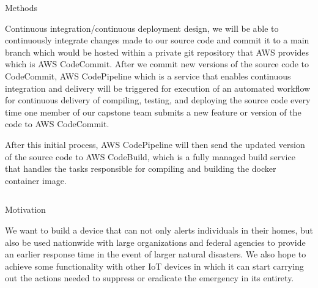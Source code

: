 \documentclass[final]{beamer}
\newlength{\onecolwid}
\newlength{\twocolwid}
\begin{document}
\begin{frame}[t]
\begin{columns}[t]
\begin{column}{\twocolwid}
\begin{columns}[t,totalwidth=\twocolwid]
\begin{column}{\onecolwid}

\begin{block}{Methods}

Continuous integration/continuous deployment design, we will be able to continuously integrate changes made to our source code  and commit it to a main branch which would be hosted within a private git repository that AWS provides which is AWS CodeCommit.  After we commit new versions of the source code to CodeCommit, AWS CodePipeline which is a service that enables continuous integration and delivery will be triggered for execution of an automated workflow for continuous delivery of compiling, testing, and deploying the source code every time one member of our capstone team submits a new feature or version of the code to AWS CodeCommit. 

After this initial process, AWS CodePipeline will then send the updated version of the source code to AWS CodeBuild, which is a fully managed build service that handles the tasks responsible for compiling  and building the docker container image. 


\end{block}


\end{column} %

\end{columns} %


\begin{alertblock}{Motivation}

We want to build a device that can not only alerts individuals in their homes, but also be used nationwide with large organizations and federal agencies to provide an earlier response time in the event of larger natural disasters. We also hope to achieve some functionality with other IoT devices in which it can start carrying out the actions needed to suppress or eradicate the emergency in its entirety.  



\end{alertblock}
\end{column}
\end{columns}
\end{frame}
\end{document}
